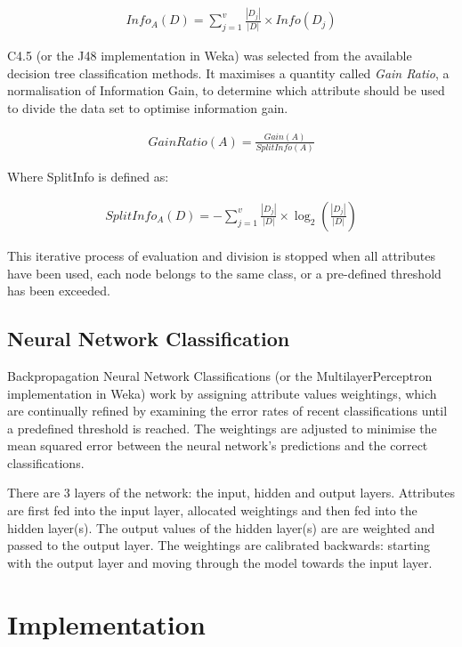 \documentclass[10pt, a4paper]{article}
\begin{document}
\begin{align*}
	Info_A(D) = \sum^{v}_{j=1}\frac{|D_j|}{|D|} \times Info(D_j)
\end{align*}


C4.5 (or the J48 implementation in Weka) was selected from the available decision tree classification methods. It maximises a quantity called \textit{Gain Ratio}, a normalisation of Information Gain, to determine which attribute should be used to divide the data set to optimise information gain.

\begin{align*}
	Gain Ratio(A) = \frac{Gain(A)}{SplitInfo(A)}
\end{align*}

Where SplitInfo is defined as:

\begin{align*}
	SplitInfo_A(D) = - \sum^{v}_{j=1}\frac{|D_j|}{|D|} \times \log_2(\frac{|D_j|}{|D|})
\end{align*}

This iterative process of evaluation and division is stopped when all attributes have been used, each node belongs to the same class, or a pre-defined threshold has been exceeded.

\subsection*{Neural Network Classification}

Backpropagation Neural Network Classifications (or the MultilayerPerceptron implementation in Weka) work by assigning attribute values weightings, which are continually refined by examining the error rates of recent classifications until a predefined threshold is reached. The weightings are adjusted to minimise the mean squared error between the neural network's predictions and the correct classifications.

There are 3 layers of the network: the input, hidden and output layers. Attributes are first fed into the input layer, allocated weightings and then fed into the hidden layer(s). The output values of the hidden layer(s) are are weighted and passed to the output layer. The weightings are calibrated backwards: starting with the output layer and moving through the model towards the input layer.

\section*{Implementation}
\end{document}

